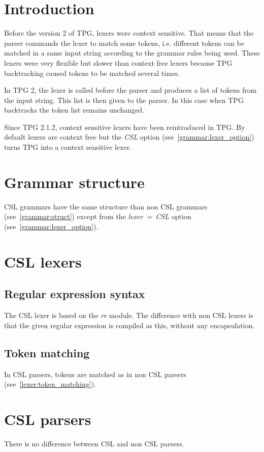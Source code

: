 \section{Introduction}          \label{CSL}

Before the version 2 of TPG, lexers were context sensitive.
That means that the parser commands the lexer to match some tokens, i.e. different tokens can be matched in a same input string according to the grammar rules being used.
These lexers were very flexible but slower than context free lexers because TPG backtracking caused tokens to be matched several times.

In TPG 2, the lexer is called before the parser and produces a list of tokens from the input string.
This list is then given to the parser.
In this case when TPG backtracks the token list remains unchanged.

Since TPG 2.1.2, context sensitive lexers have been reintroduced in TPG.
By default lexers are context free but the \emph{CSL} option (see~\ref{grammar:lexer_option}) turns TPG into a context sensitive lexer.

\section{Grammar structure}

CSL grammars have the same structure than non CSL grammars (see~\ref{grammar:struct}) except from the \emph{lexer~=~CSL} option (see~\ref{grammar:lexer_option}).

\section{CSL lexers}

\subsection{Regular expression syntax}

The CSL lexer is based on the \emph{re} module.
The difference with non CSL lexers is that the given regular expression is compiled as this, without any encapsulation.

\subsection{Token matching}

In CSL parsers, tokens are matched as in non CSL parsers (see~\ref{lexer:token_matching}).

\section{CSL parsers}

There is no difference between CSL and non CSL parsers.
